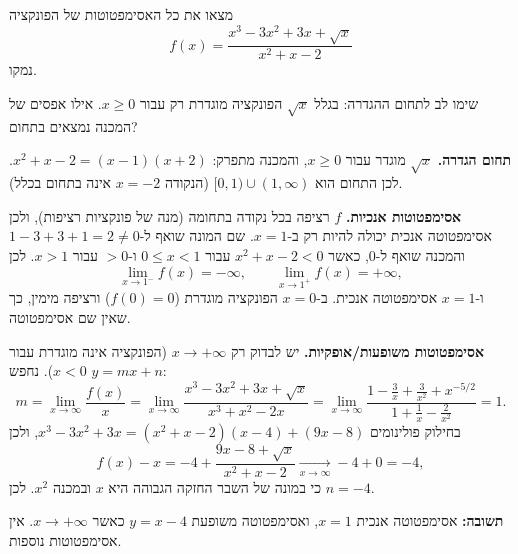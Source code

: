 
\begin{question}
מצאו את כל האסימפטוטות של הפונקציה
\[ f(x) = \frac{x^3 - 3x^2 + 3x + \sqrt{x}}{x^2 + x - 2} \]
נמקו.
\end{question}

\begin{hint}
שימו לב לתחום ההגדרה: בגלל $\sqrt{x}$ הפונקציה מוגדרת רק עבור $x \ge 0$. אילו אפסים של המכנה נמצאים בתחום?
\end{hint}

\begin{solution}
\textbf{תחום הגדרה.} $\sqrt{x}$ מוגדר עבור $x\ge0$, והמכנה מתפרק: $x^2 + x - 2 = (x-1)(x+2)$. לכן התחום הוא $[0,1)\cup(1,\infty)$
(הנקודה $x=-2$ אינה בתחום בכלל).

\textbf{אסימפטוטות אנכיות.} $f$ רציפה בכל נקודה בתחומה (מנה של פונקציות רציפות), ולכן אסימפטוטה אנכית יכולה להיות רק ב-$x=1$.
שם המונה שואף ל-$1 - 3 + 3 + 1 = 2 \neq 0$ והמכנה שואף ל-$0$, כאשר $x^2+x-2 < 0$ עבור $0\le x<1$ ו-$>0$ עבור $x>1$. לכן
\[ \lim_{x\to1^-} f(x) = -\infty, \qquad \lim_{x\to1^+} f(x) = +\infty, \]
ו-$x = 1$ אסימפטוטה אנכית. ב-$x=0$ הפונקציה מוגדרת ($f(0)=0$) ורציפה מימין, כך שאין שם אסימפטוטה.

\textbf{אסימפטוטות משופעות/אופקיות.} יש לבדוק רק $x\to+\infty$ (הפונקציה אינה מוגדרת עבור $x<0$). נחפש $y = mx + n$:
\[ m = \lim_{x\to\infty}\frac{f(x)}{x} = \lim_{x\to\infty}\frac{x^3 - 3x^2 + 3x + \sqrt{x}}{x^3 + x^2 - 2x}
= \lim_{x\to\infty}\frac{1 - \frac3x + \frac3{x^2} + x^{-5/2}}{1 + \frac1x - \frac2{x^2}} = 1. \]
בחילוק פולינומים $x^3 - 3x^2 + 3x = (x^2+x-2)(x-4) + (9x - 8)$, ולכן
\[ f(x) - x = -4 + \frac{9x - 8 + \sqrt{x}}{x^2 + x - 2} \xrightarrow[x\to\infty]{} -4 + 0 = -4, \]
כי במונה של השבר החזקה הגבוהה היא $x$ ובמכנה $x^2$. לכן $n=-4$.

\textbf{תשובה:} אסימפטוטה אנכית $x = 1$, ואסימפטוטה משופעת $y = x - 4$ כאשר $x \to +\infty$. אין אסימפטוטות נוספות.
\end{solution}
